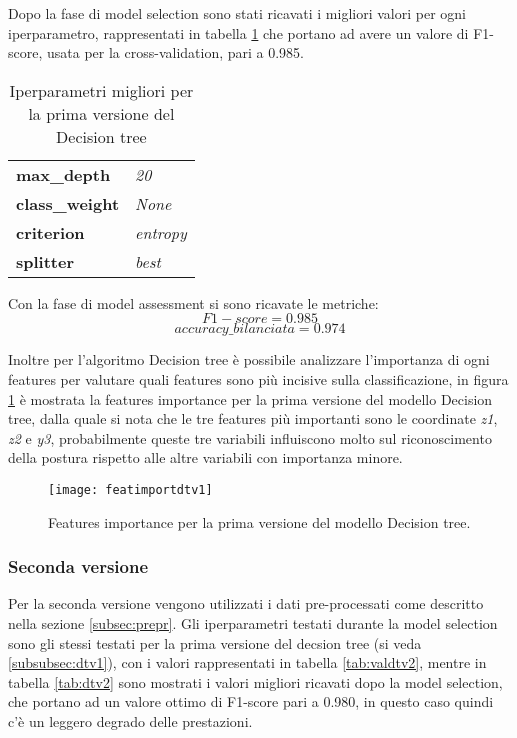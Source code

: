 Dopo la fase di model selection sono stati ricavati i migliori valori per ogni iperparametro, rappresentati in tabella \ref{tab:dtv1} che portano ad avere un valore di F1-score, usata per la cross-validation, pari a 0.985.

\begin{table}[h] 
\centering
\begin{tabular}{l l}
\hline
\textbf{max\_depth} & \textit{20}\\
\textbf{class\_weight} & \textit{None}\\
\textbf{criterion} & \textit{entropy}\\
\textbf{splitter} & \textit{best}\\
\hline
\end{tabular}
\caption{Iperparametri migliori per la prima versione del Decision tree}
\label{tab:dtv1}
\end{table}

Con la fase di model assessment si sono ricavate le metriche: $$F1-score = 0.985$$ $$accuracy\_bilanciata = 0.974$$

Inoltre per l'algoritmo Decision tree è possibile analizzare l'importanza di ogni features per valutare quali features sono più incisive sulla classificazione, in figura \ref{fig:featuresimportancedtv1} è mostrata la features importance per la prima versione del modello Decision tree, dalla quale si nota che le tre features più importanti sono le coordinate \textit{z1}, \textit{z2} e \textit{y3}, probabilmente queste tre variabili influiscono molto sul riconoscimento della postura rispetto alle altre variabili con importanza minore. 

\begin{figure}[h]
    \centering\texttt{[image: featimportdtv1]}
    \caption{Features importance per la prima versione del modello Decision tree.}
    \label{fig:featuresimportancedtv1}
\end{figure}

\subsubsection{Seconda versione}
Per la seconda versione vengono utilizzati i dati pre-processati come descritto nella sezione \ref{subsec:prepr}.  Gli iperparametri testati durante la model selection sono gli stessi testati per la prima versione del decsion tree (si veda \ref{subsubsec:dtv1}), con i valori rappresentati in tabella \ref{tab:valdtv2}, mentre in tabella \ref{tab:dtv2} sono mostrati i valori migliori ricavati dopo la model selection, che portano ad un valore ottimo di F1-score pari a 0.980, in questo caso quindi c'è un leggero degrado delle prestazioni.

